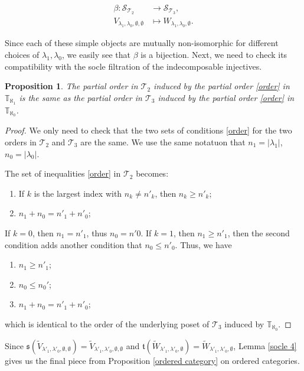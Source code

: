 \documentclass[openany, a4paper]{amsbook}
\newtheorem{prop}[thm]{Proposition}
\theoremstyle{definition}
\numberwithin{equation}{chapter}
\newcommand{\T}[1]{{\mathbb{T}}_{\aleph_{#1}}}
\begin{document}
\begin{align*}
    \beta \colon \mathcal{S}_{\mathcal{T}_2} &\longrightarrow \mathcal{S}_{\mathcal{T}_3}, \\
    V_{\lambda_1, \lambda_0, \emptyset, \emptyset} &\longmapsto W_{\lambda_1, \lambda_0, \emptyset}.
\end{align*}

Since each of these simple objects are mutually non-isomorphic for different choices of $\lambda_1, \lambda_0$, we easily see that $\beta$ is a bijection. Next, we need to check its compatibility with the socle filtration of the indecomposable injectives.

\begin{prop}
    The partial order in $\mathcal{T}_2$ induced by the partial order \eqref{order} in $\T{1}$ is the same as the partial order in $\mathcal{T}_3$ induced by the partial order \eqref{order} in $\T{0}$.
\end{prop}

\begin{proof}
    We only need to check that the two sets of conditions \eqref{order} for the two orders in $\mathcal{T}_2$ and $\mathcal{T}_3$ are the same. We use the same notatuon that $n_1 = \left\lvert \lambda_1 \right\rvert $, $n_0 = \left\lvert \lambda_0 \right\rvert $.

    The set of inequalities \eqref{order} in $\mathcal{T}_2$ becomes:
    \begin{enumerate}[label=\textbf{E.\arabic*}]
        \item If $k$ is the largest index with $n_k \neq n'_k$, then $n_k \geq n'_k$;
        \item $n_1 + n_0 = n'_1 + n'_0$;
    \end{enumerate}
    If $k = 0$, then $n_1 = n'_1$, thus $n_0 = n'0$. If $k=1$, then $n_1 \geq n'_1$, then the second condition adds another condition that $n_0 \leq n'_0$. Thus, we have 
    \begin{enumerate}[label=\textbf{F.\arabic*}]
        \item $n_1 \geq n'_1$;
        \item $n_0 \leq n_0'$;
        \item $n_1 + n_0 = n'_1 + n'_0$;
    \end{enumerate}
    which is identical to the order of the underlying poset of $\mathcal{T}_3$ induced by $\T{0}$.
\end{proof}

Since $\mathfrak{s}(\tilde{V}_{\lambda'_1, \lambda'_0, \emptyset, \emptyset}) = \tilde{V}_{\lambda'_1, \lambda'_0, \emptyset, \emptyset}$ and $\mathfrak{t}(\tilde{W}_{\lambda'_1, \lambda'_0, \emptyset}) = \tilde{W}_{\lambda'_1, \lambda'_0, \emptyset}$, Lemma \ref{socle 4} gives us the final piece from Proposition \ref{ordered category} on ordered categories.
\end{document}
